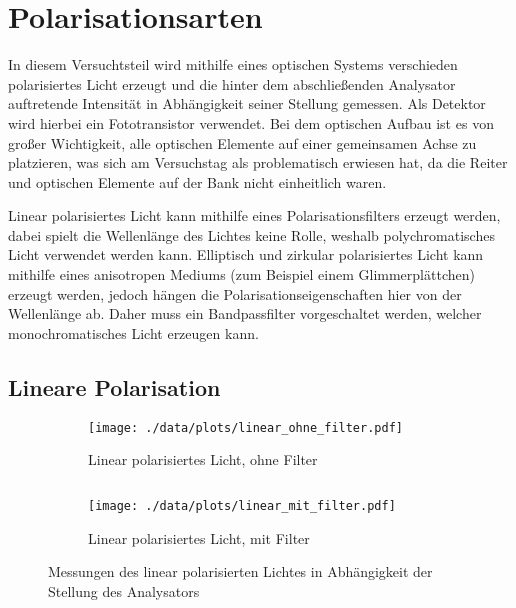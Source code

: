 \chapter{Polarisationsarten}
In diesem Versuchtsteil wird mithilfe eines optischen Systems verschieden polarisiertes Licht erzeugt und die hinter dem abschließenden Analysator auftretende Intensität in Abhängigkeit seiner Stellung gemessen.
Als Detektor wird hierbei ein Fototransistor verwendet.
Bei dem optischen Aufbau ist es von großer Wichtigkeit, alle optischen Elemente auf einer gemeinsamen Achse zu platzieren, was sich am Versuchstag als problematisch erwiesen hat, da die Reiter und optischen Elemente auf der Bank nicht einheitlich waren.\par
Linear polarisiertes Licht kann mithilfe eines Polarisationsfilters erzeugt werden, dabei spielt die Wellenlänge des Lichtes keine Rolle, weshalb polychromatisches Licht verwendet werden kann.
Elliptisch und zirkular polarisiertes Licht kann mithilfe eines anisotropen Mediums (zum Beispiel einem Glimmerplättchen) erzeugt werden, jedoch hängen die Polarisationseigenschaften hier von der Wellenlänge ab.
Daher muss ein Bandpassfilter vorgeschaltet werden, welcher monochromatisches Licht erzeugen kann.

\section{Lineare Polarisation}
\begin{figure}[tb]
	\begin{subfigure}{.4\textwidth}
		\centering
		\texttt{[image: ./data/plots/linear\_ohne\_filter.pdf]}
		\caption[ohne Filter]{Linear polarisiertes Licht, ohne Filter}
		\label{subfig:lin_nofilt}
	\end{subfigure}
	$\quad$
	\begin{subfigure}{.4\textwidth}
		\centering
		\texttt{[image: ./data/plots/linear\_mit\_filter.pdf]}
		\caption[mit Filter]{Linear polarisiertes Licht, mit Filter}
		\label{subfig:lin_withfilt}
	\end{subfigure}
	\caption[Linear polarisiertes Licht]{Messungen des linear polarisierten Lichtes in Abhängigkeit der Stellung des Analysators}
	\label{fig:meas_lin}
\end{figure}

